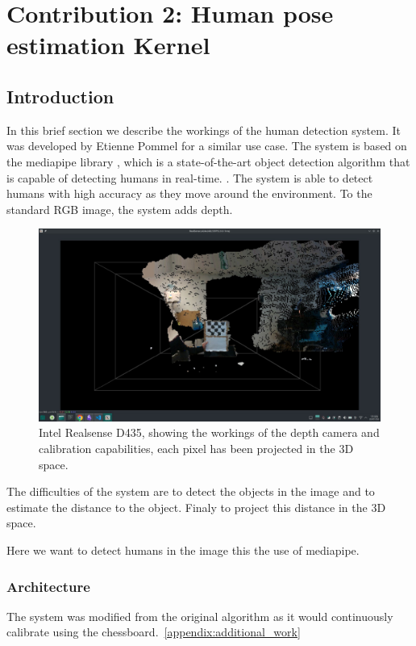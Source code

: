 \section{Contribution 2: Human pose estimation Kernel}

\subsection{Introduction}
In this brief section we describe the workings of the human detection system. It was developed by Etienne Pommel for a similar use case. The system is based on the mediapipe library \cite{mediapipe2020}, which is a state-of-the-art object detection algorithm that is capable of detecting humans in real-time. \cite{realsense_mediapipe}. The system is able to detect humans with high accuracy as they move around the environment. To the standard \gls{RGB} image, the system adds depth.

\begin{figure}[htbp]
    \centerline{\includegraphics[width=1.0\textwidth]{images/rgbd.jpeg}}
    \caption{Intel Realsense D435, showing the workings of the depth camera and calibration capabilities, each pixel has been projected in the \gls{3D} space.}
    \label{fig}
    \end{figure} 
The difficulties of the system are to detect the objects in the image and to estimate the distance to the object. Finaly to project this distance in the \gls{3D} space.

Here we want to detect humans in the image this the use of mediapipe.

\subsubsection{Architecture}
The system was modified from the original algorithm as it would continuously calibrate using the chessboard.~\ref{appendix:additional_work}

